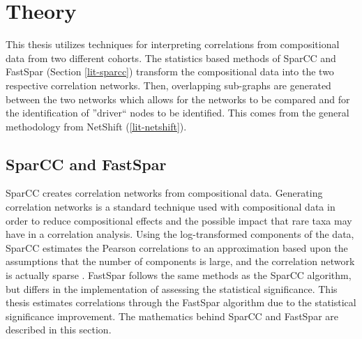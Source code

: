
\chapter{Theory}\label{chap-theory}


This thesis utilizes techniques for interpreting correlations from compositional data from two different cohorts. The statistics based methods of \acrshort{SparCC} and \acrshort{FastSpar} (Section \ref{lit-sparcc}) transform the compositional data into the two respective correlation networks. Then, overlapping sub-graphs are generated between the two networks which allows for the networks to be compared and for the identification of ''driver`` nodes to be identified. This comes from the general methodology from NetShift (\ref{lit-netshift}).


\section{SparCC and FastSpar} \label{theory-sparcc}

\acrshort{SparCC} creates correlation networks from compositional data. Generating correlation networks is a standard technique used with compositional data in order to reduce compositional effects and the possible impact that rare taxa may have in a correlation analysis. Using the log-transformed components of the data, \acrshort{SparCC} estimates the Pearson correlations to an approximation based upon the assumptions that the number of components is large, and the correlation network is actually sparse \citep{Friedman2012}. \acrshort{FastSpar} follows the same methods as the \acrshort{SparCC} algorithm, but differs in the implementation of assessing the statistical significance. This thesis estimates correlations through the \acrshort{FastSpar} algorithm due to the statistical significance improvement. The mathematics behind \acrshort{SparCC} and \acrshort{FastSpar} are described in this section. 

